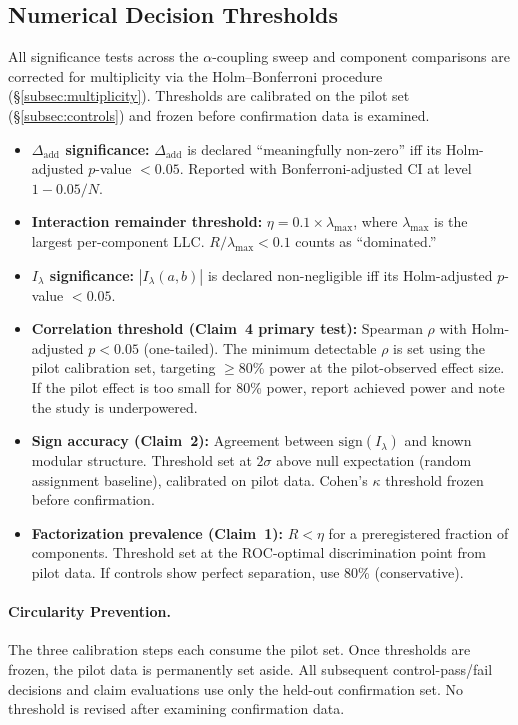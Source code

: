 \documentclass[11pt,a4paper]{article}
\theoremstyle{definition}
\theoremstyle{remark}
\newcommand{\LLC}{\lambda}
\newcommand{\Dadd}{\Delta_{\mathrm{add}}}
\newcommand{\Ilambda}{I_{\lambda}}
\begin{document}
\subsection{Numerical Decision Thresholds}\label{subsec:thresholds}

All significance tests across the $\alpha$-coupling sweep and component
comparisons are corrected for multiplicity via the Holm--Bonferroni procedure
(\S\ref{subsec:multiplicity}).  Thresholds are calibrated on the pilot set
(\S\ref{subsec:controls}) and frozen before confirmation data is examined.

\begin{itemize}
  \item \textbf{$\Dadd$ significance:} $\Dadd$ is declared ``meaningfully
    non-zero'' iff its Holm-adjusted $p$-value $< 0.05$.  Reported with
    Bonferroni-adjusted CI at level $1 - 0.05/N$.
  \item \textbf{Interaction remainder threshold:}
    $\eta = 0.1 \times \LLC_{\max}$, where $\LLC_{\max}$ is the largest
    per-component LLC.  $R/\LLC_{\max} < 0.1$ counts as ``dominated.''
  \item \textbf{$\Ilambda$ significance:} $|\Ilambda(a,b)|$ is declared
    non-negligible iff its Holm-adjusted $p$-value $< 0.05$.
  \item \textbf{Correlation threshold (Claim~4 primary test):} Spearman
    $\rho$ with Holm-adjusted $p < 0.05$ (one-tailed).  The minimum detectable
    $\rho$ is set using the pilot calibration set, targeting $\geq 80\%$ power
    at the pilot-observed effect size.  If the pilot effect is too small for
    80\% power, report achieved power and note the study is underpowered.
  \item \textbf{Sign accuracy (Claim~2):} Agreement between
    $\mathrm{sign}(\Ilambda)$ and known modular structure.  Threshold set at
    $2\sigma$ above null expectation (random assignment baseline), calibrated
    on pilot data.  Cohen's $\kappa$ threshold frozen before confirmation.
  \item \textbf{Factorization prevalence (Claim~1):} $R < \eta$ for a
    preregistered fraction of components.  Threshold set at the ROC-optimal
    discrimination point from pilot data.  If controls show perfect separation,
    use 80\% (conservative).
\end{itemize}

\paragraph{Circularity Prevention.}
The three calibration steps each consume the pilot set.  Once thresholds are
frozen, the pilot data is permanently set aside.  All subsequent
control-pass/fail decisions and claim evaluations use only the held-out
confirmation set.  No threshold is revised after examining confirmation data.
\end{document}

